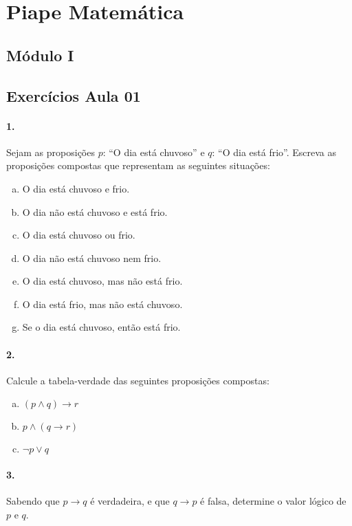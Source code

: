 \documentclass[a4paper,twocolumn,12pt]{article}
\begin{document}
 
\section*{Piape Matemática} 
 
\subsection*{Módulo I}
\subsection*{Exercícios Aula 01}
 
\paragraph*{1.} Sejam as proposições $p$: ``O dia está chuvoso'' e $q$: ``O dia está frio''. Escreva as proposições compostas que representam as seguintes situações:
\begin{enumerate}[a)]
\item O dia está chuvoso e frio.
\item O dia não está chuvoso e está frio.
\item O dia está chuvoso ou frio.
\item O dia não está chuvoso nem frio.
\item O dia está chuvoso, mas não está frio.
\item O dia está frio, mas não está chuvoso.
\item Se o dia está chuvoso, então está frio.
\end{enumerate}
  
\paragraph*{2.} Calcule a tabela-verdade das seguintes proposições compostas:
\begin{enumerate}[a)]
\item $(p \land q) \to r$
\item $p \land (q\to r)$
\item $\neg p\lor q$
\end{enumerate}

\newpage

\paragraph*{3.} Sabendo que $p\to q$ é verdadeira, e que $q\to p$ é falsa, determine o valor lógico de $p$ e $q$.
\end{document}
